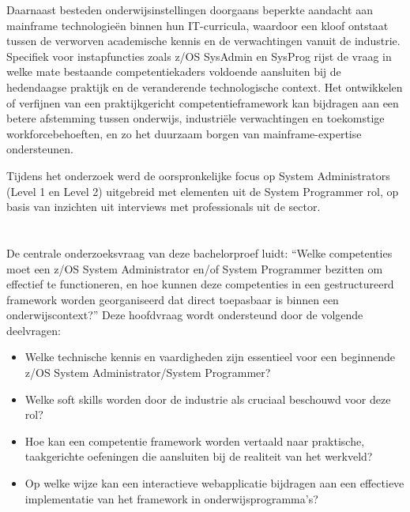 Daarnaast besteden onderwijsinstellingen doorgaans beperkte aandacht aan mainframe technologieën binnen hun IT-curricula, waardoor een kloof ontstaat tussen de verworven academische kennis en de verwachtingen vanuit de industrie. Specifiek voor instapfuncties zoals z/OS SysAdmin en SysProg rijst de vraag in welke mate bestaande competentiekaders voldoende aansluiten bij de hedendaagse praktijk en de veranderende technologische context. Het ontwikkelen of verfijnen van een praktijkgericht competentieframework kan bijdragen aan een betere afstemming tussen onderwijs, industriële verwachtingen en toekomstige workforcebehoeften, en zo het duurzaam borgen van mainframe-expertise ondersteunen.

Tijdens het onderzoek werd de oorspronkelijke focus op System Administrators (Level 1 en Level 2) uitgebreid met elementen uit de System Programmer rol, op basis van inzichten uit interviews met professionals uit de sector.

\section{}%
\label{sec:onderzoeksvraag}
De centrale onderzoeksvraag van deze bachelorproef luidt: “Welke competenties
moet een z/OS System Administrator en/of System Programmer bezitten om effectief te functioneren, en hoe kunnen deze competenties in een
gestructureerd framework worden georganiseerd dat direct toepasbaar is binnen
een onderwijscontext?”
Deze hoofdvraag wordt ondersteund door de volgende deelvragen:
\begin{itemize}
\item Welke technische kennis en vaardigheden zijn essentieel voor een beginnende
z/OS System Administrator/System Programmer?
\item Welke soft skills worden door de industrie als cruciaal beschouwd voor deze
rol?
\item Hoe kan een competentie framework worden vertaald naar praktische, taakgerichte oefeningen die aansluiten bij de realiteit van het werkveld?
\item Op welke wijze kan een interactieve webapplicatie bijdragen aan een effectieve implementatie van het framework in onderwijsprogramma’s?
\end{itemize}
